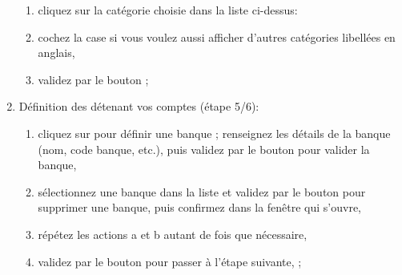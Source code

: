\begin{enumerate}
		\begin{enumerate} 
		 	\item cliquez sur la catégorie choisie dans la liste ci-dessus:
			\item cochez la case  si vous voulez aussi afficher d'autres catégories libellées en anglais,
			\item validez par le bouton  ;
		\end{enumerate}		

	\item Définition des  détenant vos comptes (étape 5/6):
		\begin{enumerate} 
		 	\item cliquez sur   pour définir une banque ; renseignez les détails de la banque (nom, code banque, etc.), puis validez par le bouton  pour valider la banque,
			\item sélectionnez une banque dans la liste et validez par le bouton  pour supprimer une banque, puis confirmez dans la fenêtre qui s'ouvre,
			\item répétez les actions a et b autant de fois que nécessaire,
			\item  validez par le bouton  pour passer à l'étape suivante,  ;
		\end{enumerate}		 	


\end{enumerate}
